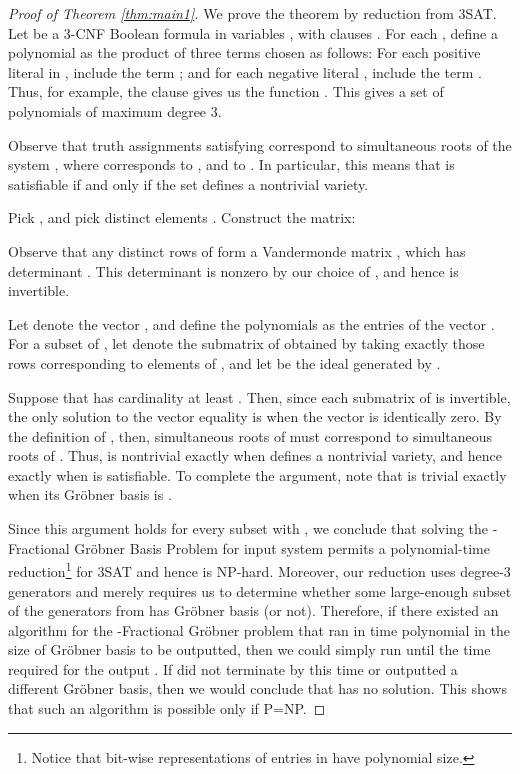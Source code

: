 \documentclass{article}
\begin{document}
\begin{proof}[Proof of Theorem \ref{thm:main1}]
We prove the theorem by reduction from 3SAT.  Let  be a 3\nobreakdash-CNF Boolean formula in variables , with clauses . For each , define a polynomial  as the product of three terms chosen as follows: For each positive literal  in , include the term ; and for each negative literal , include the term . Thus, for example, the clause  gives us the function . This gives a set of  polynomials of maximum degree 3.

Observe that truth assignments satisfying  correspond to simultaneous roots of the system , where  corresponds to , and  to . In particular, this means that  is satisfiable if and only if the set  defines a nontrivial variety.

Pick , and pick  distinct elements .  Construct the  matrix:



Observe that any  distinct rows  of  form a Vandermonde matrix , which has determinant .  This determinant is nonzero by our choice of , and hence is  invertible.

Let  denote the vector , and define the polynomials  as the entries of the vector .  For  a subset of , let  denote the  submatrix of  obtained by taking exactly those rows corresponding to elements of , and let  be the ideal generated by .

Suppose that  has cardinality at least . Then, since each  submatrix of  is invertible, the only solution to the vector equality  is when the vector  is identically zero.  By the definition of , then, simultaneous roots of  must correspond to simultaneous roots of .  Thus,  is nontrivial exactly when  defines a nontrivial variety, and hence exactly when  is satisfiable.  To complete the argument, note that  is trivial exactly when its Gr\"obner basis is .

Since this argument holds for every subset  with , we conclude that solving the \nobreakdash-Fractional Gr\"obner Basis Problem for input system  permits a polynomial-time reduction\footnote{Notice that bit-wise representations of entries in  have polynomial size.} for 3SAT and hence is NP-hard.  Moreover, our reduction uses 
degree-3 generators and merely requires us to determine whether some large-enough subset of the generators from  has Gr\"obner basis  (or not). Therefore, if there existed an algorithm  for the \nobreakdash-Fractional Gr\"obner problem that ran in time polynomial in the size of Gr\"obner basis to be outputted, then we could simply run  until the time required for the output .  If  did not terminate by this time or outputted a different Gr\"obner basis, then we would conclude that  has no solution.  This shows that such an algorithm  is possible only if P=NP. 
\end{proof}
\end{document}
